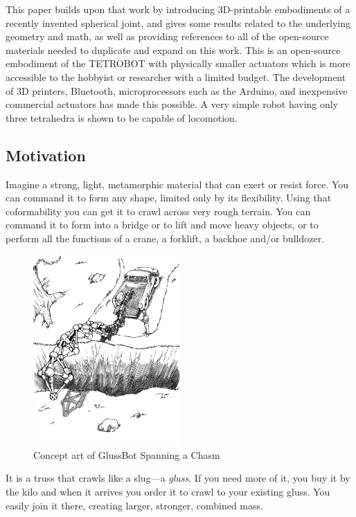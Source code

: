 \documentclass[11pt]{article}
\begin{document}
This paper builds upon that work by
introducing 3D-printable embodiments of
a recently invented spherical joint\cite{song2003spherical},
and gives some results related to the underlying geometry and math, as well as providing
references to all of the open-source materials needed to duplicate and expand on this work. This is an
open-source embodiment of the TETROBOT with physically smaller actuators which is more accessible to the
hobbyist or researcher with a limited budget.  The development of 3D printers, Bluetooth, microprocessors
such as the Arduino, and inexpensive commercial actuators has made this possible.
A very simple robot having only three tetrahedra is shown to be capable of locomotion.

\subsection{Motivation}

Imagine a strong, light, metamorphic material that can exert or resist force.
You can command it to form any shape, limited only by its flexibility.
Using that coformability you can get it to crawl across very rough terrain.
You can command it to form into a bridge or to lift and move heavy objects,
or to perform all the functions of a crane, a forklift, a backhoe and/or bulldozer.

\begin{figure}[H]
  \centering
    \includegraphics[width=0.5\textwidth]{figures/robotTruckChasm.png}
    \caption[Concept art of GlussBot Spanning a Chasm]{Concept art of GlussBot Spanning a Chasm}
      \label{chasmspan}
\end{figure}

It is a truss that crawls like a slug---a \emph{gluss}.
If you need more of it, you buy it by the kilo and when it arrives you order it
to crawl to your existing gluss. You easily join it there, creating
larger, stronger, combined mass.
\end{document}
